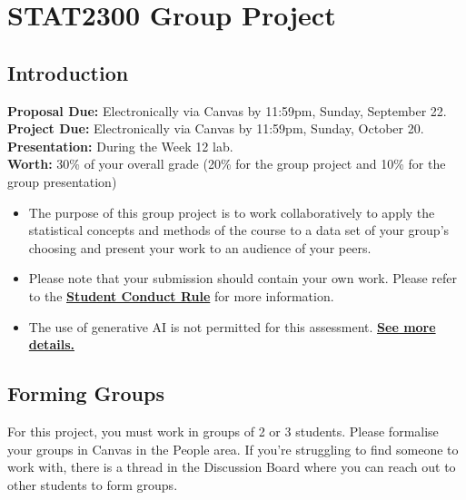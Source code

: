 \documentclass[10pt]{article}
\begin{document}

{\centering\section*{STAT2300 Group Project}}

\subsection*{Introduction}

\textbf{Proposal Due:} Electronically via Canvas by 11:59pm, Sunday, September 22. \\[0.2cm]
\textbf{Project Due:} Electronically via Canvas by 11:59pm, Sunday, October 20. \\[0.2cm]
\textbf{Presentation:} During the Week 12 lab. \\[0.2cm]
\textbf{Worth:} 30\% of your overall grade (20\% for the group project and 10\% for the group presentation)

\begin{itemize}
    \item The purpose of this group project is to work collaboratively to apply the statistical concepts and methods of the course to a data set of your group's choosing and present your work to an audience of your peers.
    \item Please note that your submission should contain your own work. Please refer to the \href{https://policies.newcastle.edu.au/document/view-current.php?id=34}{\textbf{Student Conduct Rule}} for more information.
    \item The use of generative AI is not permitted for this assessment. \href{https://www.newcastle.edu.au/current-students/study-essentials/assessment-and-exams/assessments-and-assignments/artificial-intelligence-in-assessment}{\textbf{See more details.}}
\end{itemize}

\subsection*{Forming Groups}

For this project, you must work in groups of 2 or 3 students. Please formalise your groups in Canvas in the People area. If you're struggling to find someone to work with, there is a thread in the Discussion Board where you can reach out to other students to form groups.
\end{document}
